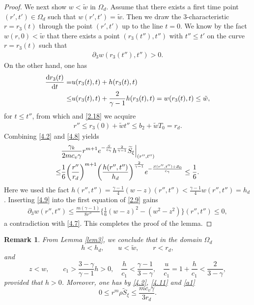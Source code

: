 \documentclass[11pt,reqno]{article}
\newtheorem{rem}{Remark}
\newcommand{\fr}{\frac}
\newcommand{\pa}{\partial}
\numberwithin{equation}{section}
\begin{document}
\begin{proof}
We next show $w< \tilde{w}$ in $\Omega_d$. Assume that there exists a first time point $(r',t')\in\Omega_d$ such that $w(r',t')=\tilde{w}$. Then we draw the $3$-characteristic $r=r_3(t)$ through the point $(r',t')$ up to the line $t=0$. We know by the fact $w(r,0)<\tilde{w}$ that there exists a point $(r_3(t''),t'')$ with $t''\leq t'$ on the curve $r=r_3(t)$ such that
\begin{align}\label{4.7}
\pa_3w(r_3(t''),t'')>0.
\end{align}
On the other hand, one has
\begin{align*}
\fr{{\rm d}r_3(t)}{{\rm d}t}=& u(r_3(t),t)+h(r_3(t),t) \\
\leq& u(r_3(t),t) +\fr{2}{\gamma-1}h(r_3(t),t)= w(r_3(t),t)\leq\tilde{w},
\end{align*}
for $t\leq t''$, from which and \eqref{2.18} we acquire
\begin{align}\label{4.8}
r''\leq r_3(0)+\tilde{w}t''\leq b_2+\tilde{w}T_0=r_d.
\end{align}
Combining \eqref{4.2} and \eqref{4.8} yields
\begin{align}\label{4.9}
&\frac{\gamma_k}{2m c_v\gamma}r^{m+1}e^{-\fr{S}{c_\gamma}}h^{\fr{2}{\gamma-1}}\widetilde{S}_\xi\Big|_{(r'',t'')} \notag \\
\leq &\fr{1}{6}\bigg(\fr{r''}{r_d}\bigg)^{m+1}\bigg(\fr{h(r'',t'')}{h_d}\bigg)^{\fr{2}{\gamma-1}} e^{-\fr{S(r'',t'')+\mathcal{S}_0}{c_\gamma}}\leq \fr{1}{6}.
\end{align}
Here we used the fact $h(r'',t'')=\fr{\gamma-1}{4}(w-z)(r'',t'')<\fr{\gamma-1}{4}w(r'',t'')= h_d$.
Inserting \eqref{4.9} into the first equation of \eqref{2.9} gains
\begin{align}\label{4.10}
\pa_3w(r'',t'')\leq \frac{m(\gamma-1)}{8r''} \bigg\{\fr{1}{6}(w-z)^2 - (w^2-z^2)\bigg\}(r'',t'')\leq0,
\end{align}
a contradiction with \eqref{4.7}. This completes the proof of the lemma.
\end{proof}
\begin{rem}\label{r6}
From Lemma \ref{lem3}, we conclude that in the domain $\Omega_d$
\begin{equation}\label{4.11}
h<h_d,\qquad u<\tilde{w}, \qquad r<r_d,
\end{equation}
and
\begin{equation}\label{4.12}
z<w,\qquad c_1 > \frac{3-\gamma}{\gamma-1} h>0,\quad \fr{h}{c_1}< \fr{\gamma-1}{3-\gamma},\quad \fr{u}{c_1}=1+\fr{h}{c_1}<\fr{2}{3-\gamma},
\end{equation}
provided that $h>0$. Moreover, one has by \eqref{4.2}, \eqref{4.11} and \eqref{a1}
\begin{equation}\label{a2}
0\leq r^m\rho \widetilde{S}_\xi\leq \fr{mc_v\gamma}{3r_d}.
\end{equation}
\end{rem}
\end{document}
